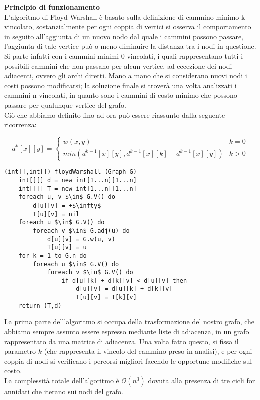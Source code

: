 \documentclass[../cheatSheetAlgoritmi.tex]{subfiles}
\begin{document}
\bigskip
\textbf{Principio di funzionamento} \\
L'algoritmo di Floyd-Warshall è basato sulla definizione di cammino minimo k-vincolato, sostanzialmente per ogni coppia di vertici si osserva il comportamento in seguito all'aggiunta di un nuovo nodo dal quale i cammini possono passare, l'aggiunta di tale vertice può o meno diminuire la distanza tra i nodi in questione. Si parte infatti con i cammini minimi 0 vincolati, i quali rappresentano tutti i possibili cammini che non passano per alcun vertice, ad eccezione dei nodi adiacenti, ovvero gli archi diretti. Mano a mano che si considerano nuovi nodi i costi possono modificarsi; la soluzione finale si troverà  una volta analizzati i cammini n-vincolati, in quanto sono i cammini di costo minimo che possono passare per qualunque vertice del grafo. \\
Ciò che abbiamo definito fino ad ora può essere riassunto dalla seguente ricorrenza: 

\[
  d^{k}[x][y]=\begin{cases}
               w(x, y) & k = 0\\
               min(d^{k-1}[x][y], d^{k-1}[x][k] + d^{k-1}[x][y]) & k > 0
            \end{cases}
\]
\begin{lstlisting}[caption=Algoritmo di Floyd e Warshall cammini minimi a sorgente multipla]
(int[],int[]) floydWarshall (Graph G)
	int[][] d = new int[1...n][1...n]
	int[][] T = new int[1...n][1...n]
	foreach u, v $\in$ G.V() do
		d[u][v] = +$\infty$
		T[u][v] = nil
	foreach u $\in$ G.V() do
		foreach v $\in$ G.adj(u) do
			d[u][v] = G.w(u, v)
			T[u][v] = u
	for k = 1 to G.n do
		foreach u $\in$ G.V() do
			foreach v $\in$ G.V() do
				if d[u][k] + d[k][v] < d[u][v] then
					d[u][v] = d[u][k] + d[k][v]
					T[u][v] = T[k][v]
	return (T,d)
\end{lstlisting}
La prima parte dell'algoritmo si occupa della trasformazione del nostro grafo, che abbiamo sempre assunto essere espresso mediante liste di adiacenza, in un grafo rappresentato da una matrice di adiacenza. Una volta fatto questo, si fissa il parametro $k$ (che rappresenta il vincolo del cammino preso in analisi), e per ogni coppia di nodi si verificano i percorsi migliori facendo le opportune modifiche sul costo. \\
La complessità totale dell'algoritmo è $\mathcal{O}(n^3)$ dovuta alla presenza di tre cicli for annidati che iterano sui nodi del grafo.
\newpage
\end{document}
